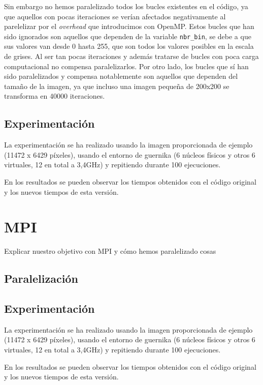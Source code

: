 \documentclass[12pt]{report} %
\begin{document}
Sin embargo no hemos paralelizado todos los bucles existentes en el código, ya que aquellos con pocas iteraciones se verían afectados negativamente al parelelizar por el \textit{overhead} que introducimos con OpenMP. Estos bucles que han sido ignorados son aquellos que dependen de la variable \texttt{nbr\_bin}, se debe a que sus valores van desde 0 hasta 255, que son todos los valores posibles en la escala de grises. Al ser tan pocas iteraciones y además tratarse de bucles con poca carga computacional no compensa paralelizarlos. Por otro lado, los bucles que sí han sido paralelizados y compensa notablemente son aquellos que dependen del tamaño de la imagen, ya que incluso una imagen pequeña de 200x200 se transforma en 40000 iteraciones.


\section{Experimentación}

La experimentación se ha realizado usando la imagen proporcionada de ejemplo (11472 x 6429 píxeles), usando el entorno de guernika (6 núcleos físicos y otros 6 virtuales, 12 en total a 3,4GHz) y repitiendo durante 100 ejecuciones.

En los resultados se pueden observar los tiempos obtenidos con el código original y los nuevos tiempos de esta versión.

\chapter{MPI}
\label{chap:MPI}

Explicar nuestro objetivo con MPI y cómo hemos paralelizado cosas

\section{Paralelización}

\section{Experimentación}

La experimentación se ha realizado usando la imagen proporcionada de ejemplo (11472 x 6429 píxeles), usando el entorno de guernika (6 núcleos físicos y otros 6 virtuales, 12 en total a 3,4GHz) y repitiendo durante 100 ejecuciones.

En los resultados se pueden observar los tiempos obtenidos con el código original y los nuevos tiempos de esta versión.
\end{document}
